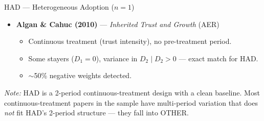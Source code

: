\documentclass[10pt,aspectratio=169]{beamer}
\begin{document}
\begin{frame}{\textcolor{hadColor}{HAD} --- Heterogeneous Adoption ($n=1$)}
\begin{itemize}
  \item \textbf{Algan \& Cahuc (2010)} --- \emph{Inherited Trust and Growth} (AER)
  \begin{itemize}
    \item Continuous treatment (trust intensity), no pre-treatment period.
    \item Some stayers ($D_1 = 0$), variance in $D_2 \mid D_2 > 0$ --- exact match for HAD.
    \item $\sim$50\% negative weights detected.
  \end{itemize}
\end{itemize}
\vfill
\footnotesize\textit{Note:} HAD is a 2-period continuous-treatment design with a clean baseline. Most continuous-treatment papers in the sample have multi-period variation that does \emph{not} fit HAD's 2-period structure --- they fall into OTHER.
\end{frame}
\end{document}
